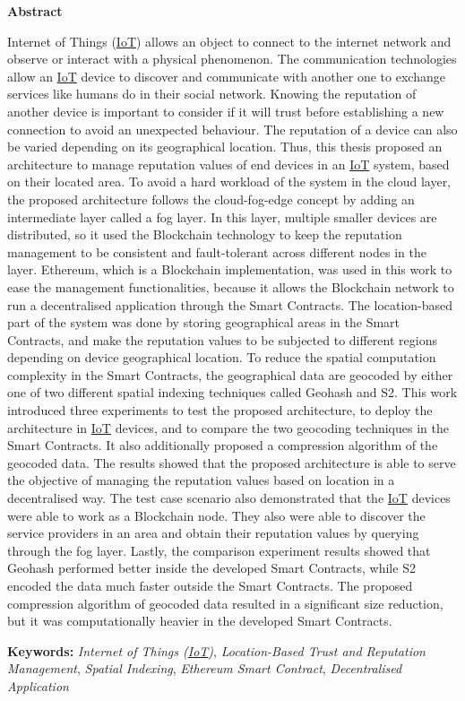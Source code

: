 \thispagestyle{plain}
\begin{flushleft}
  \LARGE
  \textbf{Abstract}
  \vspace{0.4cm}
  \large
\end{flushleft} \label{Abstract}

\npara Internet of Things (\hyperref[Acronym-IoT]{IoT}) allows an object to connect to the internet network and observe or interact with a physical phenomenon.
The communication technologies allow an \hyperref[Acronym-IoT]{IoT} device to discover and communicate with another one to exchange services like humans do in their social network.
Knowing the reputation of another device is important to consider if it will trust before establishing a new connection to avoid an unexpected behaviour.
The reputation of a device can also be varied depending on its geographical location.
Thus, this thesis proposed an architecture to manage reputation values of end devices in an \hyperref[Acronym-IoT]{IoT} system, based on their located area.
To avoid a hard workload of the system in the cloud layer, the proposed architecture follows the cloud-fog-edge concept by adding an intermediate layer called a fog layer.
In this layer, multiple smaller devices are distributed, so it used the Blockchain technology to keep the reputation management to be consistent and fault-tolerant across different nodes in the layer.
Ethereum, which is a Blockchain implementation, was used in this work to ease the management functionalities, because it allows the Blockchain network to run a decentralised application through the Smart Contracts.
The location-based part of the system was done by storing geographical areas in the Smart Contracts, and make the reputation values to be subjected to different regions depending on device geographical location.
To reduce the spatial computation complexity in the Smart Contracts, the geographical data are geocoded by either one of two different spatial indexing techniques called Geohash and S2.
This work introduced three experiments to test the proposed architecture, to deploy the architecture in \hyperref[Acronym-IoT]{IoT} devices, and to compare the two geocoding techniques in the Smart Contracts.
It also additionally proposed a compression algorithm of the geocoded data.
The results showed that the proposed architecture is able to serve the objective of managing the reputation values based on location in a decentralised way.
The test case scenario also demonstrated that the \hyperref[Acronym-IoT]{IoT} devices were able to work as a Blockchain node.
They also were able to discover the service providers in an area and obtain their reputation values by querying through the fog layer.
Lastly, the comparison experiment results showed that Geohash performed better inside the developed Smart Contracts, while S2 encoded the data much faster outside the Smart Contracts.
The proposed compression algorithm of geocoded data resulted in a significant size reduction, but it was computationally heavier in the developed Smart Contracts.

\npara \textbf{Keywords:}
  \textit{Internet of Things (\hyperref[Acronym-IoT]{IoT})},
  \textit{Location-Based Trust and Reputation Management},
  \textit{Spatial Indexing},
  \textit{Ethereum Smart Contract},
  \textit{Decentralised Application}
